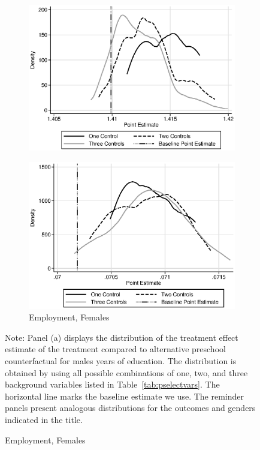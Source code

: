 \begin{figure}
\begin{subfigure}[h]{0.4\textwidth}
		\includegraphics[width=\textwidth]{output/sencontrols_female_years_30y_epan_ipw_P1.eps}
\end{subfigure}%
\begin{subfigure}[h]{0.4\textwidth}
	\centering
	\caption{Employment, Females}
		\includegraphics[width=\textwidth]{output/sencontrols_female_si30y_works_epan_ipw_P1.eps}
\end{subfigure}
\footnotesize \justify
Note: Panel (a) displays the distribution of the treatment effect estimate of the treatment compared to alternative preschool counterfactual for males years of education. The distribution is obtained by using all possible combinations of one, two, and three background variables listed in Table~\ref{tab:pselectvars}. The horizontal line marks the baseline estimate we use. The reminder panels present analogous distributions for the outcomes and genders indicated in the title.\\
\end{figure}

